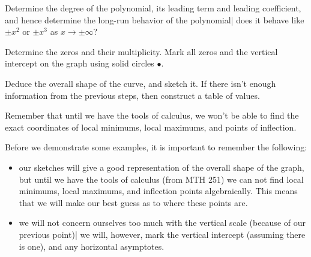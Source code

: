 	 \begin{pccspecialcomment}
		 \begin{steps}
			 \item \label{poly:step:first} Determine the degree of the polynomial,
			 its leading term and leading coefficient, and hence determine
			 the long-run behavior of the polynomial| does it behave like $\pm x^2$ or $\pm x^3$
			 as $x\rightarrow\pm\infty$?
			 \item Determine the zeros and their multiplicity. Mark all zeros
			 and the vertical intercept on the graph using solid circles $\bullet$.
			 \item \label{poly:step:last}  Deduce the overall shape of the curve, and sketch it. If there isn't
			 enough information from the previous steps, then construct a table of values.
		 \end{steps}
		 Remember that until we have the tools of calculus, we won't be able to
		 find the exact coordinates of local minimums, local maximums, and points
		 of inflection.
	 \end{pccspecialcomment}
	 Before we demonstrate some examples, it is important to remember the following:
	 \begin{itemize}
		 \item our sketches will give a good representation of the overall
		       shape of the graph, but until we have the tools of calculus (from MTH 251)
		       we can not find local minimums, local maximums, and inflection points algebraically. This
		       means that we will make our best guess as to where these points are.
		 \item we will not concern ourselves too much with the vertical scale (because of
		       our previous point)| we will, however, mark the vertical intercept (assuming there is one),
		       and any horizontal asymptotes.
	 \end{itemize}
